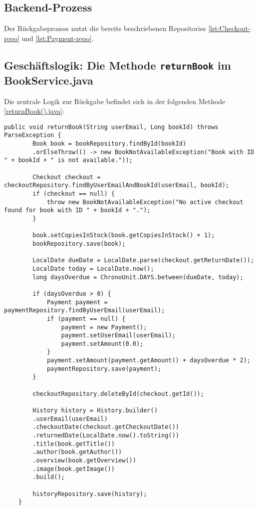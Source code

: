 \subsection{Backend-Prozess}
Der Rückgabeprozess nutzt die bereits beschriebenen Repositories \ref{lst:Checkout-repo} und \ref{lst:Payment-repo}. 

\subsection*{Geschäftslogik: Die Methode \texttt{returnBook} im BookService.java} 

Die zentrale Logik zur Rückgabe befindet sich in der folgenden Methode \ref{returnBook().java}:

\begin{lstlisting}[style=pseudocode, caption=returnBook() Methode in BookService.java, label=returnBook().java, breaklines=true]
	public void returnBook(String userEmail, Long bookId) throws ParseException {
		Book book = bookRepository.findById(bookId)
		.orElseThrow(() -> new BookNotAvailableException("Book with ID " + bookId + " is not available."));
		
		Checkout checkout = checkoutRepository.findByUserEmailAndBookId(userEmail, bookId);
		if (checkout == null) {
			throw new BookNotAvailableException("No active checkout found for book with ID " + bookId + ".");
		}
		
		book.setCopiesInStock(book.getCopiesInStock() + 1);
		bookRepository.save(book);
		
		LocalDate dueDate = LocalDate.parse(checkout.getReturnDate());
		LocalDate today = LocalDate.now();
		long daysOverdue = ChronoUnit.DAYS.between(dueDate, today);
		
		if (daysOverdue > 0) {
			Payment payment = paymentRepository.findByUserEmail(userEmail);
			if (payment == null) {
				payment = new Payment();
				payment.setUserEmail(userEmail);
				payment.setAmount(0.0);
			}
			payment.setAmount(payment.getAmount() + daysOverdue * 2);
			paymentRepository.save(payment);
		}
		
		checkoutRepository.deleteById(checkout.getId());
		
		History history = History.builder()
		.userEmail(userEmail)
		.checkoutDate(checkout.getCheckoutDate())
		.returnedDate(LocalDate.now().toString())
		.title(book.getTitle())
		.author(book.getAuthor())
		.overview(book.getOverview())
		.image(book.getImage())
		.build();
		
		historyRepository.save(history);
	}
\end{lstlisting}

